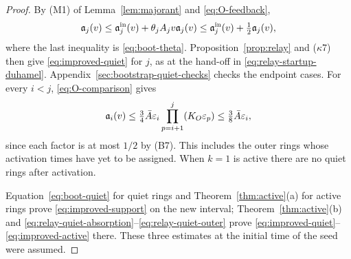 \begin{proof}
By (M1) of Lemma~\ref{lem:majorant} and \eqref{eq:O-feedback},
\begin{equation}
\label{eq:relay-quiet-absorption}
\mathfrak{a}_j(v)\le\mathfrak{a}_j^{\mathrm{in}}(v)+\theta_j A_jv\mathfrak{a}_j(v)
\le\mathfrak{a}_j^{\mathrm{in}}(v)+\tfrac12\mathfrak{a}_j(v),
\end{equation}
where the last inequality is \eqref{eq:boot-theta}.
Proposition~\ref{prop:relay} and ($\kappa$7) then give
\eqref{eq:improved-quiet} for $j$, as at the hand-off in
\eqref{eq:relay-startup-duhamel}. Appendix~\ref{sec:bootstrap-quiet-checks}
checks the endpoint cases. For every $i<j$, \eqref{eq:O-comparison} gives
\begin{equation}
\label{eq:relay-quiet-outer}
\mathfrak{a}_i(v)\le\tfrac34\bar A\varepsilon_i
\prod_{p=i+1}^{j}(K_O\varepsilon_p)
\le\tfrac38\bar A\varepsilon_i,
\end{equation}
since each factor is at most $1/2$ by (B7). This includes the outer rings
whose activation times have yet to be assigned. When $k=1$ is active
there are no quiet rings after activation.

Equation~\eqref{eq:boot-quiet} for quiet rings and Theorem~\ref{thm:active}(a)
for active rings prove \eqref{eq:improved-support} on the new interval;
Theorem~\ref{thm:active}(b) and
\eqref{eq:relay-quiet-absorption}--\eqref{eq:relay-quiet-outer} prove
\eqref{eq:improved-quiet}--\eqref{eq:improved-active} there.
These three estimates at the initial time of the seed were assumed.
\end{proof}
